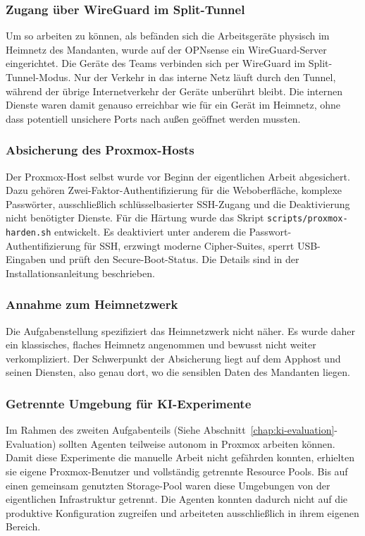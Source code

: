 \subsubsection*{Zugang über WireGuard im Split-Tunnel}

Um so arbeiten zu können, als befänden sich die Arbeitsgeräte physisch im
Heimnetz des Mandanten, wurde auf der OPNsense ein WireGuard-Server
eingerichtet. Die Geräte des Teams verbinden sich per WireGuard im
Split-Tunnel-Modus. Nur der Verkehr in das interne Netz läuft durch den
Tunnel, während der übrige Internetverkehr der Geräte unberührt bleibt. Die
internen Dienste waren damit genauso erreichbar wie für ein Gerät im Heimnetz,
ohne dass potentiell unsichere Ports nach außen geöffnet werden mussten.

\subsubsection*{Absicherung des Proxmox-Hosts} \label{sec:SSH}

Der Proxmox-Host selbst wurde vor Beginn der eigentlichen Arbeit abgesichert.
Dazu gehören Zwei-Faktor-Authentifizierung für die Weboberfläche, komplexe
Passwörter, ausschließlich schlüsselbasierter \ac{SSH}-Zugang und die
Deaktivierung nicht benötigter Dienste. Für die Härtung wurde das Skript
\texttt{scripts/proxmox-harden.sh} entwickelt. Es deaktiviert unter anderem
die Passwort-Authentifizierung für \ac{SSH}, erzwingt moderne Cipher-Suites,
sperrt \ac{USB}-Eingaben und prüft den Secure-Boot-Status. Die Details sind in
der Installationsanleitung beschrieben.

\subsubsection*{Annahme zum Heimnetzwerk}

Die Aufgabenstellung spezifiziert das Heimnetzwerk nicht näher. Es wurde daher
ein klassisches, flaches Heimnetz angenommen und bewusst nicht weiter
verkompliziert. Der Schwerpunkt der Absicherung liegt auf dem Apphost und
seinen Diensten, also genau dort, wo die sensiblen Daten des Mandanten liegen.

\subsubsection*{Getrennte Umgebung für \ac{KI}-Experimente}

Im Rahmen des zweiten Aufgabenteils (Siehe Abschnitt~\ref{chap:ki-evaluation}-Evaluation) sollten Agenten
teilweise autonom in Proxmox arbeiten können. Damit diese Experimente die
manuelle Arbeit nicht gefährden konnten, erhielten sie eigene
Proxmox-Benutzer und vollständig getrennte Resource Pools. Bis auf einen
gemeinsam genutzten Storage-Pool waren diese Umgebungen von der eigentlichen
Infrastruktur getrennt. Die Agenten konnten dadurch nicht auf die produktive
Konfiguration zugreifen und arbeiteten ausschließlich in ihrem eigenen
Bereich.

